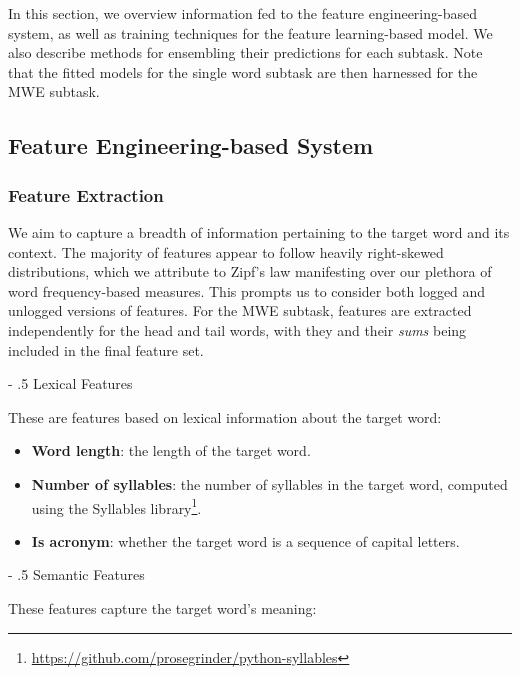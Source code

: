 \documentclass[11pt,a4paper]{article}
\makeatletter
\renewcommand\paragraph{%
    \@startsection{paragraph}{4}{0mm}%
        {-\baselineskip}%
        {.5\baselineskip}%
        {\normalfont\normalsize\bfseries}}
\makeatother
\begin{document}
In this section, we overview information fed to the feature engineering-based system, as well as training techniques for the feature learning-based model. We also describe methods for ensembling their predictions for each subtask. Note that the fitted models for the single word subtask are then harnessed for the MWE subtask.

\subsection{Feature Engineering-based System}

\subsubsection{Feature Extraction}

We aim to capture a breadth of information pertaining to the target word and its context. The majority of features appear to follow heavily right-skewed distributions, which we attribute to Zipf's law manifesting over our plethora of word frequency-based measures. This prompts us to consider both logged and unlogged versions of features. For the MWE subtask, features are extracted independently for the head and tail words, with they and their \textit{sums} being included in the final feature set.

\paragraph{Lexical Features}

These are features based on lexical information about the target word:

\begin{itemize}
  \item \textbf{Word length}: the length of the target word.
  \item \textbf{Number of syllables}: the number of syllables in the target word, computed using the Syllables library\footnote{\url{https://github.com/prosegrinder/python-syllables}}.
  \item \textbf{Is acronym}: whether the target word is a sequence of capital letters.
\end{itemize}
  
\paragraph{Semantic Features}

These features capture the target word's meaning:
\end{document}
